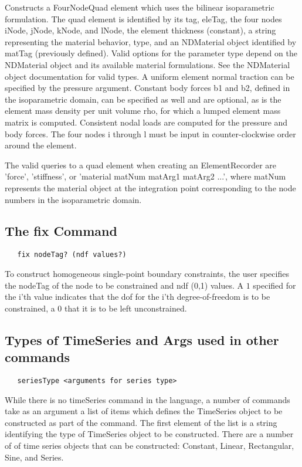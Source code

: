 \documentclass[12pt]{article}
\begin{document}
\noindent Constructs a FourNodeQuad element which uses the bilinear
isoparametric formulation. The quad element is identified by its tag,
eleTag, the four nodes iNode, jNode, kNode, and lNode, the element
thickness (constant), a string representing the material behavior,
type, and an NDMaterial object identified by matTag (previously
defined). Valid options for the parameter type depend on the
NDMaterial object and its available material formulations. See the
NDMaterial object documentation for valid types. A uniform element
normal traction can be specified by the pressure argument. Constant
body forces b1 and b2, defined in the isoparametric domain, can be
specified as well and are optional, as is the element mass density per
unit volume rho, for which a lumped element mass matrix is
computed. Consistent nodal loads are computed for the pressure and
body forces. The four nodes i through l must be input in
counter-clockwise order around the element.

The valid queries to a quad element when creating an ElementRecorder
are 'force', 'stiffness', or 'material matNum matArg1 matArg2 ...',  where matNum
represents the material object at the integration point corresponding to the node numbers
in the isoparametric domain.

\subsection{The fix Command}
{\sf\small
\begin{verbatim}
   fix nodeTag? (ndf values?)
\end{verbatim}
}

To construct homogeneous single-point boundary constraints, the user
specifies the nodeTag of the node to be constrained and ndf (0,1)
values. A $1$ specified for the i'th value indicates that the dof for
the i'th degree-of-freedom is to be constrained, a $0$ that it is to be
left unconstrained.


\subsection{Types of TimeSeries and Args used in other commands}

{\sf\small
\begin{verbatim}
   seriesType <arguments for series type>
\end{verbatim}
}


While there is no timeSeries command in the language, a number of
commands take as an argument a list of items which defines 
the TimeSeries object to be constructed as part of the command. The
first element of the list is a string identifying the type of
TimeSeries object to be constructed. There are a number of of
time series objects that can be constructed: 
Constant, Linear, Rectangular, Sine, and Series. 
\end{document}
